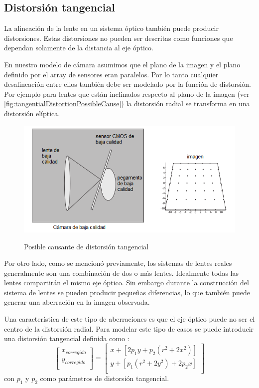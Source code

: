 \subsection{Distorsión tangencial}

La alineación de la lente en un sistema óptico también puede producir distorsiones. Estas distorsiones no pueden ser descritas como funciones que dependan solamente de la distancia al eje óptico.

En nuestro modelo de cámara asumimos que el plano de la imagen y el plano definido por el array de sensores eran paralelos. Por lo tanto cualquier desalineación entre ellos también debe ser modelado por la función de distorsión. Por ejemplo para lentes que están inclinados respecto al plano de la imagen (ver \autoref{fig:tangentialDistortionPossibleCause}) la distorsión radial se transforma en una distorsión elíptica.
\begin{figure}[bth]
    \myfloatalign
        {\includegraphics[width=1.0\linewidth]{images/tangentialDistortionPossibleCause}}
        \caption{Posible causante de distorsión tangencial}
        \label{fig:tangentialDistortionPossibleCause}
\end{figure}

Por otro lado, como se mencionó previamente, los sistemas de lentes reales generalmente son una combinación de dos o más lentes. Idealmente todas las lentes compartirán el mismo eje óptico. Sin embargo durante la construcción del sistema de lentes se pueden producir pequeñas diferencias, lo que también puede generar una aberración en la imagen observada.

Una característica de este tipo de aberraciones es que el eje óptico puede no ser el centro de la distorsión radial. Para modelar este tipo de casos se puede introducir una distorsión tangencial definida como \cite{bradski2008learning}:
\begin{equation*}
	\begin{bmatrix}
	    x_{corregido} \\
	    y_{corregido} \\
	\end{bmatrix}
	= 
	\begin{bmatrix}
	    x + [ 2 p_1 y + p_2 (r^2 + 2 x^2) ] \\
	    y + [ p_1 (r^2 + 2 y^2) + 2 p_2 x ] \\
	\end{bmatrix}
\end{equation*}
con $p_1$ y $p_2$ como parámetros de distorsión tangencial.

